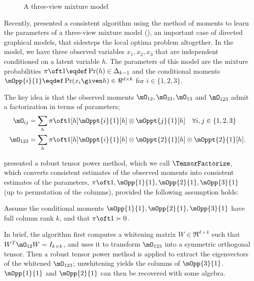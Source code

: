 \begin{figure}[t]
  \label{fig:three-view}
  \centering
  
  \caption{A three-view mixture model}
\end{figure}

Recently, \citet{anandkumar12moments} presented a consistent algorithm
  using the method of moments to learn the parameters of a three-view
  mixture model (), an important case of directed
  graphical models, that sidesteps the local optima problem altogether. 
In the model, we have three observed variables $x_1, x_2, x_3$
  that are independent conditioned on a latent variable $h$.  
The parameters of this model are the mixture probabilities $\pi\oft 1 \eqdef
  \Pr(h) \in \Delta_{k-1}$ and the conditional moments $\mOpp{i}{1} \eqdef
  \Pr(x_i \given h) \in \Re^{d \times k}$ for $i \in \{1,2,3\}$.

  The key idea is that the observed moments $\mO_{12}, \mO_{23}, \mO_{13}$ and
  $\mO_{123}$ admit a factorization in terms of parameters;
\begin{align*}
  \mO_{ij} &= \sum_h {\pi \oft 1}[h] {\mOppt{i}{1}}[h] \otimes {\mOppt{j}{1}}[h] \quad \forall i,j \in \{1,2,3\} \\
  \mO_{123} &= \sum_h {\pi \oft 1}[h] {\mOppt{i}{1}}[h] \otimes {\mOppt{2}{1}}[h] \otimes  {\mOppt{2}{1}}[h].
\end{align*}

\citet{anandkumar13tensor} presented a robust tensor power method, which
  we call $\TensorFactorize$, which converts consistent estimates of the observed moments 
  into consistent estimates of the parameters, $\pi\oft 1, \mOpp{1}{1},
  \mOpp{2}{1},\mOpp{3}{1}$ (up to permutation of the columns), provided
  the following assumption holds:

\begin{assumption}
\label{asm:full-rank}
Assume the conditional moments $\mOpp{1}{1}, \mOpp{2}{1}, \mOpp{3}{1}$ have full column rank
  $k$, and that $\pi\oft 1 \succ 0$.
\end{assumption}

In brief, the algorithm first computes a whitening matrix $W \in
  \Re^{d \times k}$ such that $W^T \mO_{12} W = I_{k \times k}$,
  and uses it to transform $\mO_{123}$ into a symmetric orthogonal tensor.  
Then a robust tensor power method is applied to extract the eigenvectors
of the whitened $\mO_{123}$; unwhitening yields the columns of $\mOpp{3}{1}$.
  $\mOpp{1}{1}$ and $\mOpp{2}{1}$ can then be recovered with some algebra.

